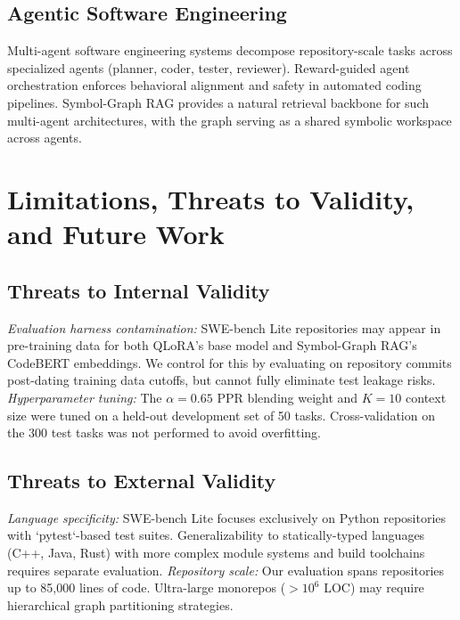 \documentclass[10pt,journal,compsoc,twocolumn]{IEEEtran}
\begin{document}
\subsection{Agentic Software Engineering}


Multi-agent software engineering systems \cite{arxiv_2404_01131,arxiv_2412_06333} decompose repository-scale tasks across specialized agents (planner, coder, tester, reviewer). Reward-guided agent orchestration enforces behavioral alignment and safety in automated coding pipelines. Symbol-Graph RAG provides a natural retrieval backbone for such multi-agent architectures, with the graph serving as a shared symbolic workspace across agents.




\section{Limitations, Threats to Validity, and Future Work}



\subsection{Threats to Internal Validity}


\textit{Evaluation harness contamination:} SWE-bench Lite repositories may appear in pre-training data for both QLoRA's base model and Symbol-Graph RAG's CodeBERT embeddings. We control for this by evaluating on repository commits post-dating training data cutoffs, but cannot fully eliminate test leakage risks. \textit{Hyperparameter tuning:} The $\alpha = 0.65$ PPR blending weight and $K = 10$ context size were tuned on a held-out development set of 50 tasks. Cross-validation on the 300 test tasks was not performed to avoid overfitting.


\subsection{Threats to External Validity}


\textit{Language specificity:} SWE-bench Lite focuses exclusively on Python repositories with `pytest`-based test suites. Generalizability to statically-typed languages (C++, Java, Rust) with more complex module systems and build toolchains requires separate evaluation. \textit{Repository scale:} Our evaluation spans repositories up to 85,000 lines of code. Ultra-large monorepos ($>10^6$ LOC) may require hierarchical graph partitioning strategies.
\end{document}
